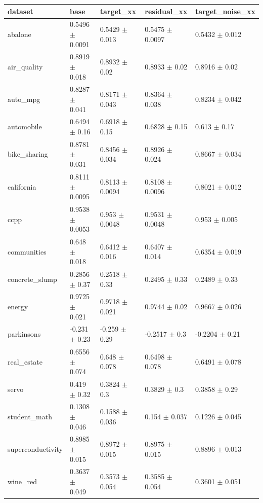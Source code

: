 \begin{tabular}{lllll}
\toprule
dataset & base & target\_xx & residual\_xx & target\_noise\_xx \\
\midrule
abalone & 0.5496 $\pm$ 0.0091 & 0.5429 $\pm$ 0.013 & 0.5475 $\pm$ 0.0097 & 0.5432 $\pm$ 0.012 \\
air\_quality & 0.8919 $\pm$ 0.018 & 0.8932 $\pm$ 0.02 & 0.8933 $\pm$ 0.02 & 0.8916 $\pm$ 0.02 \\
auto\_mpg & 0.8287 $\pm$ 0.041 & 0.8171 $\pm$ 0.043 & 0.8364 $\pm$ 0.038 & 0.8234 $\pm$ 0.042 \\
automobile & 0.6494 $\pm$ 0.16 & 0.6918 $\pm$ 0.15 & 0.6828 $\pm$ 0.15 & 0.613 $\pm$ 0.17 \\
bike\_sharing & 0.8781 $\pm$ 0.031 & 0.8456 $\pm$ 0.034 & 0.8926 $\pm$ 0.024 & 0.8667 $\pm$ 0.034 \\
california & 0.8111 $\pm$ 0.0095 & 0.8113 $\pm$ 0.0094 & 0.8108 $\pm$ 0.0096 & 0.8021 $\pm$ 0.012 \\
ccpp & 0.9538 $\pm$ 0.0053 & 0.953 $\pm$ 0.0048 & 0.9531 $\pm$ 0.0048 & 0.953 $\pm$ 0.005 \\
communities & 0.648 $\pm$ 0.018 & 0.6412 $\pm$ 0.016 & 0.6407 $\pm$ 0.014 & 0.6354 $\pm$ 0.019 \\
concrete\_slump & 0.2856 $\pm$ 0.37 & 0.2518 $\pm$ 0.33 & 0.2495 $\pm$ 0.33 & 0.2489 $\pm$ 0.33 \\
energy & 0.9725 $\pm$ 0.021 & 0.9718 $\pm$ 0.021 & 0.9744 $\pm$ 0.02 & 0.9667 $\pm$ 0.026 \\
parkinsons & -0.231 $\pm$ 0.23 & -0.259 $\pm$ 0.29 & -0.2517 $\pm$ 0.3 & -0.2204 $\pm$ 0.21 \\
real\_estate & 0.6556 $\pm$ 0.074 & 0.648 $\pm$ 0.078 & 0.6498 $\pm$ 0.078 & 0.6491 $\pm$ 0.078 \\
servo & 0.419 $\pm$ 0.32 & 0.3824 $\pm$ 0.3 & 0.3829 $\pm$ 0.3 & 0.3858 $\pm$ 0.29 \\
student\_math & 0.1308 $\pm$ 0.046 & 0.1588 $\pm$ 0.036 & 0.154 $\pm$ 0.037 & 0.1226 $\pm$ 0.045 \\
superconductivity & 0.8985 $\pm$ 0.015 & 0.8972 $\pm$ 0.015 & 0.8975 $\pm$ 0.015 & 0.8896 $\pm$ 0.013 \\
wine\_red & 0.3637 $\pm$ 0.049 & 0.3573 $\pm$ 0.054 & 0.3585 $\pm$ 0.054 & 0.3601 $\pm$ 0.051 \\
\bottomrule
\end{tabular}
